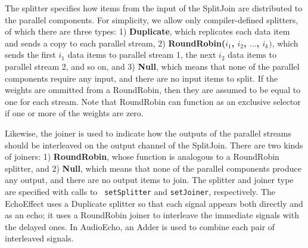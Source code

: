 The splitter specifies how items from the input of the SplitJoin are
distributed to the parallel components.  For simplicity, we allow only
compiler-defined splitters, of which there are three types: 1) {\bf
Duplicate}, which replicates each data item and sends a copy to each
parallel stream, 2) {\bf RoundRobin($i_1$, $i_2$, $\dots$, $i_k)$},
which sends the first $i_1$ data items to parallel stream 1, the next
$i_2$ data items to parallel stream 2, and so on, and 3) {\bf Null},
which means that none of the parallel components require any input,
and there are no input items to split.  If the weights are ommitted
from a RoundRobin, then they are assumed to be equal to one for each
stream.  Note that RoundRobin can function as an exclusive selector if
one or more of the weights are zero.

Likewise, the joiner is used to indicate how the outputs of the
parallel streams should be interleaved on the output channel of the
SplitJoin.  There are two kinds of joiners: 1) {\bf RoundRobin}, whose
function is analogous to a RoundRobin splitter, and 2) {\bf Null},
which means that none of the parallel components produce any output,
and there are no output items to join.
The splitter and joiner type are specified with calls to {\tt
setSplitter} and {\tt setJoiner}, respectively.  The EchoEffect 
uses a Duplicate splitter so that each signal appears both directly
and as an echo; it uses a RoundRobin joiner to interleave the immediate
signals with the delayed ones.  In AudioEcho, an Adder is used to 
combine each pair of interleaved signals.

